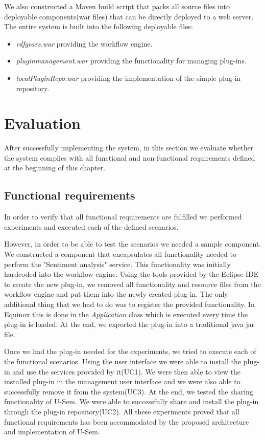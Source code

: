 We also constructed a Maven build script that packs all source files into deployable components(war files) that can be directly deployed to a web server. The entire system is built into the following deployable files:
\begin{itemize}
	\item \textit{rdfgears.war} providing the workflow engine.
	\item \textit{pluginmanagement.war} providing the functionality for managing plug-ins.
	\item \textit{localPluginRepo.war} providing the implementation of the simple plug-in repository.
\end{itemize}


\section{Evaluation}
\label{sec:evalPlugin}

After successfully implementing the system, in this section we evaluate whether the system complies with all functional and non-functional requirements defined at the beginning of this chapter. 

\subsection{Functional requirements}

In order to verify that all functional requirements are fulfilled we performed experiments and executed each of the defined scenarios.
 
However, in order to be able to test the scenarios we needed a sample component. We constructed a component that encapsulates all functionality needed to perform the "Sentiment analysis" service. This functionality was initially hardcoded into the workflow engine. Using the tools provided by the Eclipse IDE to create the new plug-in, we removed all functionality and resource files from the workflow engine and put them into the newly created plug-in. The only additional thing that we had to do was to register the provided functionality. In Equinox this is done in the \textit{Application} class which is executed every time the plug-in is loaded. At the end, we exported the plug-in into a traditional java jar file.

Once we had the plug-in needed for the experiments, we tried to execute each of the functional scenarios. Using the user interface we were able to install the plug-in and use the services provided by it(UC1). We were then able to view the installed plug-in in the management user interface and we were also able to successfully remove it from the system(UC3). At the end, we tested the sharing functionality of U-Sem. We were able to successfully share and install the plug-in through the plug-in repository(UC2). All these experiments proved that all functional requirements has been accommodated by the proposed architecture and implementation of U-Sem.


